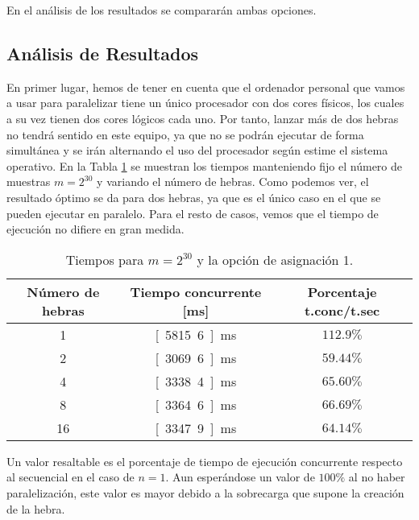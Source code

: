 En el análisis de los resultados se compararán ambas opciones.

\subsection{Análisis de Resultados}

En primer lugar, hemos de tener en cuenta que el ordenador personal que vamos
a usar para paralelizar tiene un único procesador con dos cores físicos, los cuales a su vez tienen
dos cores lógicos cada uno. Por tanto, lanzar más de dos hebras no tendrá sentido en este equipo,
ya que no se podrán ejecutar de forma simultánea y se irán alternando el uso del procesador
según estime el sistema operativo. En la Tabla \ref{tab:dist_num_hebras} se muestran los tiempos
manteniendo fijo el número de muestras $m=2^{30}$ y variando el número de hebras.
Como podemos ver, el resultado óptimo se da para dos hebras, ya que es el único caso en el que se pueden ejecutar en paralelo.
Para el resto de casos, vemos que el tiempo de ejecución no difiere en gran medida.
\begin{table}
    \centering
    \begin{tabular}{|c|c|c|}
        \hline
        \textbf{Número de hebras} & \textbf{Tiempo concurrente [ms]} & \textbf{Porcentaje t.conc/t.sec} \\
        \hline
        1 & \unit[5815.6]{ms} & $112.9\%$ \\
        2 & \unit[3069.6]{ms} & $59.44\%$ \\
        4 & \unit[3338.4]{ms} & $65.60\%$ \\
        8 & \unit[3364.6]{ms} & $66.69\%$ \\
        16 & \unit[3347.9]{ms} & $64.14\%$ \\
        \hline
    \end{tabular}
    \caption{Tiempos para $m=2^{30}$ y la opción de asignación 1.}
    \label{tab:dist_num_hebras}
\end{table}
Un valor resaltable es el porcentaje de tiempo de ejecución concurrente respecto al secuencial en el caso de $n=1$.
Aun esperándose un valor de $100\%$ al no haber paralelización, este valor es mayor debido a la sobrecarga que supone la creación de la hebra.

